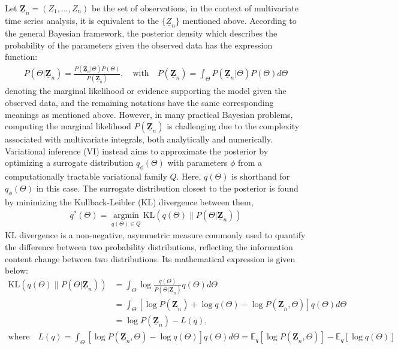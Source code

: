 \documentclass[12pt,a4paper]{article}
\begin{document}
Let $\underline{\mathbf{Z}}_n = (Z_1, ..., Z_n)$ be the set of observations, in the context of multivariate time series analysis, it is equivalent to the $\{\underline Z_{n}\}$ mentioned above. According to the general Bayesian framework, the posterior density which describes the probability of the parameters given the observed data has the expression function:
\begin{align*}
P(\Theta|\underline{\mathbf{Z}}_n)= \frac{P(\underline{\mathbf{Z}}_n|\Theta)P(\Theta)}{P(\underline{\mathbf{Z}}_n)}, \quad \text{with} \quad P(\underline{\mathbf{Z}}_n) = \int_{\Theta} P(\underline{\mathbf{Z}}_n|\Theta)P(\Theta) d\Theta
\end{align*}
denoting the marginal likelihood or evidence supporting the model given the observed data, and the remaining notations have the same corresponding meanings as mentioned above. However, in many practical Bayesian problems, computing the marginal likelihood $P(\underline{\mathbf{Z}}_n)$ is challenging due to the complexity associated with multivariate integrals, both analytically and numerically. Variational inference (VI) instead aims to approximate the posterior by optimizing a surrogate distribution $q_{\phi}(\Theta)$ with parameters $\phi$ from a computationally tractable variational family $Q$. Here, $q(\Theta)$ is shorthand for $q_{\phi}(\Theta)$ in this case. The surrogate distribution closest to the posterior is found by minimizing the  Kullback-Leibler (KL) divergence between them,
\begin{align*}
q^*(\Theta) = \mathop{\arg\min}\limits_{q(\Theta) \in Q} \text{KL} \left( q(\Theta) \| P(\Theta | \underline{\mathbf{Z}}_n) \right)
\end{align*}
KL divergence is a non-negative, asymmetric measure commonly used to quantify the difference between two probability distributions, reflecting the information content change between two distributions. Its mathematical expression is given below:
\begin{align*}
\text{KL} \left( q(\Theta) \| P(\Theta | \underline{\mathbf{Z}}_n) \right) &= \int_{\Theta} \log \frac{q(\Theta)}{P(\Theta|\underline{\mathbf{Z}}_n)} q(\Theta) d\Theta \\
&= \int_{\Theta} \left[\log P(\underline{\mathbf{Z}}_n) +\log q(\Theta)-\log P(\underline{\mathbf{Z}}_n, \Theta) \right]q(\Theta) d\Theta \\
&= \log P(\underline{\mathbf{Z}}_n) - L(q),
\end{align*}
\begin{align*}
\text{where} \quad L(q) = \int_{\Theta} \left[\log P(\underline{\mathbf{Z}}_n, \Theta)-\log q(\Theta) \right]q(\Theta) d\Theta = \mathbb{E}_q [\log P(\underline{\mathbf{Z}}_n, \Theta)] - \mathbb{E}_q [\log q(\Theta)]
\end{align*}
\end{document}
